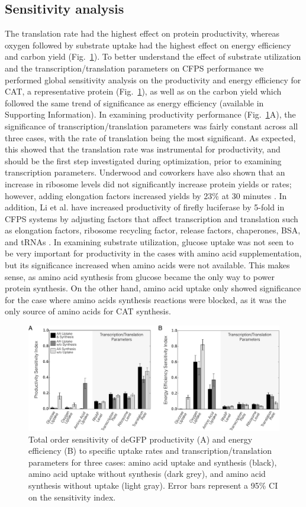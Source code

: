 \documentclass[journal=asbcd6,manuscript=article]{achemso}
\begin{document}
\subsection{Sensitivity analysis}
The translation rate had the highest effect on protein productivity, whereas oxygen followed by substrate uptake had the highest effect on energy efficiency and carbon yield (Fig.~\ref{fig:SI}).
To better understand the effect of substrate utilization and the transcription/translation parameters on CFPS performance we performed global sensitivity analysis on the productivity and energy efficiency for CAT, a representative protein (Fig.~\ref{fig:SI}), as well as on the carbon yield which followed the same trend of significance as energy efficiency (available in Supporting Information).
In examining productivity performance (Fig.~\ref{fig:SI}A), the significance of transcription/translation parameters was fairly constant across all three cases, with the rate of translation being the most significant.
As expected, this showed that the translation rate was instrumental for productivity, and should be the first step investigated during optimization, prior to examining transcription parameters.
Underwood and coworkers have also shown that an increase in ribosome levels did not significantly increase protein yields or rates; however, adding elongation factors increased yields by 23\% at 30 minutes \cite{2005_underwood_biotech}.
In addition, Li et al. have increased productivity of firefly luciferase by 5-fold in CFPS systems by adjusting factors that affect transcription and translation such as elongation factors, ribosome recycling factor, release factors, chaperones, BSA, and tRNAs \cite{2014_li_PlosOne}.
In examining substrate utilization, glucose uptake was not seen to be very important for productivity in the cases with amino acid supplementation, but its significance increased when amino acids were not available.
This makes sense, as amino acid synthesis from glucose became the only way to power protein synthesis.
On the other hand, amino acid uptake only showed significance for the case where amino acids synthesis reactions were blocked, as it was the only source of amino acids for CAT synthesis.
\begin{figure}[t!]
\includegraphics[width=1.00\textwidth]{./figs/Fig-3-Sensitivity-Analysis.pdf}
\caption{Total order sensitivity of deGFP productivity (A) and energy efficiency (B) to specific uptake rates and transcription/translation parameters for three cases: amino acid uptake and synthesis (black), amino acid uptake without synthesis (dark grey), and amino acid synthesis without uptake (light gray). Error bars represent a 95\% CI on the sensitivity index.}
\label{fig:SI}
\end{figure}
\end{document}
